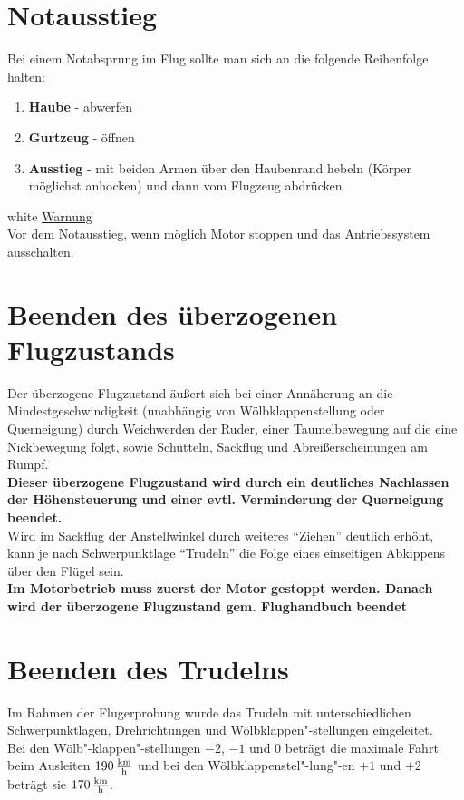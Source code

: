 \section{Notausstieg}

Bei einem Notabsprung im Flug sollte man sich an die folgende Reihenfolge halten: 
\begin{enumerate}
\item \textbf{Haube} - abwerfen
\item \textbf{Gurtzeug} - öffnen
\item \textbf{Ausstieg} - mit beiden Armen über den Haubenrand hebeln (Körper möglichst anhocken) und dann vom Flugzeug abdrücken
\end{enumerate}

\begin{color}{white}
\large{\underline{Warnung}}\\
Vor dem Notausstieg, wenn möglich Motor stoppen und das Antriebssystem ausschalten.
\end{color}

\section{Beenden des überzogenen Flugzustands}
Der überzogene Flugzustand äußert sich bei einer Annäherung an die Mindestgeschwindigkeit (unabhängig von Wölbklappenstellung oder Querneigung) durch Weichwerden der Ruder, einer Taumelbewegung auf die eine Nickbewegung folgt, sowie Schütteln, Sackflug und Abreißerscheinungen am Rumpf.\\
\newline
\textbf{Dieser überzogene Flugzustand wird durch ein deutliches Nachlassen der Höhensteuerung und einer evtl. Verminderung der Querneigung beendet.}\\
\newline
Wird im Sackflug der Anstellwinkel durch weiteres "`Ziehen"' deutlich erhöht, kann je nach Schwerpunktlage "`Trudeln"' die Folge eines einseitigen Abkippens über den Flügel sein.\\

\textbf{Im Motorbetrieb muss zuerst der Motor gestoppt werden. Danach wird der überzogene Flugzustand gem. Flughandbuch beendet}
\newpage
\section{Beenden des Trudelns}
Im Rahmen der Flugerprobung wurde das Trudeln mit unterschiedlichen Schwerpunktlagen, Drehrichtungen und Wölbklappen"-stellungen eingeleitet.\\
Bei den Wölb"-klappen"-stellungen \textbf{$-2$}, \textbf{$-1$} und \textbf{$0$} beträgt die maximale Fahrt beim Ausleiten \textbf{$\unit[190]{\frac{km}{h}}$} und bei den Wölbklappenstel"-lung"-en \textbf{$+1$} und \textbf{$+2$} beträgt sie \textbf{$\unit[170]{\frac{km}{h}}$}.
\newline

